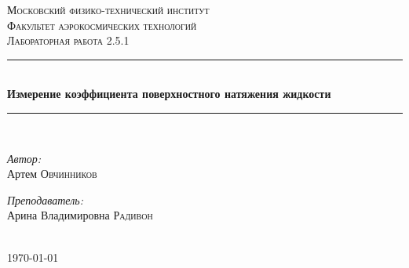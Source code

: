 \documentclass[a4paper,12pt]{article} %
\begin{document}
\begin{titlepage}
\newcommand{\HRule}{\rule{\linewidth}{0.3 mm}} %

\center %
 

\textsc{\Large Московский физико-технический институт }\\[1.5cm] %
\textsc{\Large Факультет аэрокосмических технологий}\\[0.5cm] %
\textsc{\large Лабораторная работа 2.5.1}\\[0.5cm] %


\HRule \\[0.4cm]
{ \huge \bfseries Измерение коэффициента поверхностного натяжения жидкости }\\[0.4cm] %
\HRule \\[1.5cm]
 

\begin{minipage}{0.4\textwidth}
\begin{flushleft} \large
\emph{Автор:}\\ Артем \textsc{Овчинников} %
\end{flushleft}
\end{minipage}
\begin{minipage}{0.4\textwidth}
\begin{flushright} \large
\emph{Преподаватель:} \\
Арина Владимировна \textsc{Радивон} %
\end{flushright}
\end{minipage}\\[4cm]

{\large \today}\\[2cm] %


 

\vfill %

\end{titlepage}
\tableofcontents
\newpage
\end{document}
